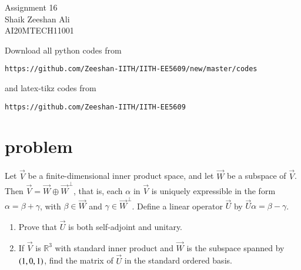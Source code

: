 \documentclass[journal,12pt]{IEEEtran}
\begin{document}
\renewcommand{\thefigure}{\theproblem}
\def\putbox#1#2#3{\makebox[0in][l]{\makebox[#1][l]{}\raisebox{\baselineskip}[0in][0in]{\raisebox{#2}[0in][0in]{#3}}}}
     \def\rightbox#1{\makebox[0in][r]{#1}}
     \def\centbox#1{\makebox[0in]{#1}}
     \def\topbox#1{\raisebox{-\baselineskip}[0in][0in]{#1}}
     \def\midbox#1{\raisebox{-0.5\baselineskip}[0in][0in]{#1}}
\vspace{2cm}
\begin{center}
\huge Assignment 16\\
\large Shaik Zeeshan Ali\\
\large AI20MTECH11001\\
\end{center}
Download all python codes from 
\begin{lstlisting}
https://github.com/Zeeshan-IITH/IITH-EE5609/new/master/codes
\end{lstlisting}
and latex-tikz codes from 
\begin{lstlisting}
https://github.com/Zeeshan-IITH/IITH-EE5609
\end{lstlisting}
\section{problem}
Let $\vec{V}$ be a finite-dimensional inner product space, and let $\vec{W}$ be a subspace of $\vec{V}$. Then $\vec{V}=\vec{W}\oplus\vec{W}^\perp$, that is, each $\alpha$ in $\vec{V}$ is uniquely expressible in the form $\alpha=\beta+\gamma$, with $\beta\in\vec{W}$ and $\gamma\in\vec{W}^\perp$. Define a linear operator $\vec{U}$ by $\vec{U}\alpha=\beta-\gamma$.
\begin{enumerate}
    \item Prove that $\vec{U}$ is both self-adjoint and unitary.
    \item If $\vec{V}$ is $\mathbb{R}^3$ with standard inner product and $\vec{W}$ is the subspace spanned by $\left(1,0,1\right)$, find the matrix of $\vec{U}$ in the standard ordered basis.
\end{enumerate}
\end{document}
